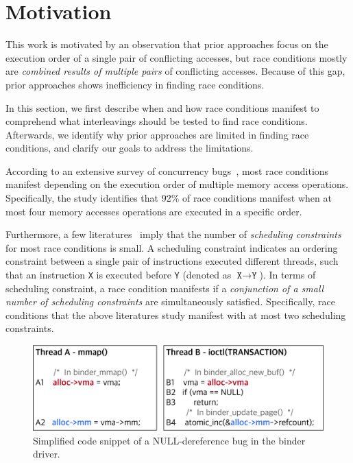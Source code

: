 \section{Motivation}
\label{s:motivation}

This work is motivated by an observation that prior approaches
focus on the execution order of a single pair of conflicting
accesses, but race conditions mostly are \textit{combined results of multiple pairs} 
of conflicting accesses.
%
Because of this gap, prior approaches shows inefficiency in finding race
conditions.

In this section, we first describe when and how race conditions
manifest to comprehend what interleavings should be tested to find
race conditions.
%
Afterwards, we identify why prior approaches are limited in finding
race conditions, and clarify our goals to address the limitations.


%
According to an extensive survey of concurrency
bugs~\cite{learningfrommistakes}, most race conditions manifest
depending on the execution order of multiple memory access operations.
%
Specifically, the study identifies that 92\% of race conditions manifest 
when at most four memory accesses operations are executed in a specific
order.

%
%
Furthermore, a few literatures~\cite{pctalgorithm, ski, snorlax,
  failuresketching} imply that the number of \textit{scheduling
  constraints} for most race conditions is small.
%
A scheduling constraint indicates an ordering constraint between a
single pair of instructions executed different threads, such that an
instruction \texttt{X} is executed before \texttt{Y} (denoted as
$\texttt{X} \rightarrow \texttt{Y}$).
%
In terms of scheduling constraint, a race condition manifests if a
\textit{conjunction of a small number of scheduling constraints} are
simultaneously satisfied.
%
\dr{}
%
Specifically, race conditions that the above literatures study
manifest with at most two scheduling constraints.



\begin{figure}[t]
  \centering
  \includegraphics[width=0.95\linewidth]{fig/cve-2017-10661.pdf}
  \caption{Simplified code snippet of a NULL-dereference bug in the
    binder driver.}
  \label{fig:cve-2019-6974}
\end{figure}

